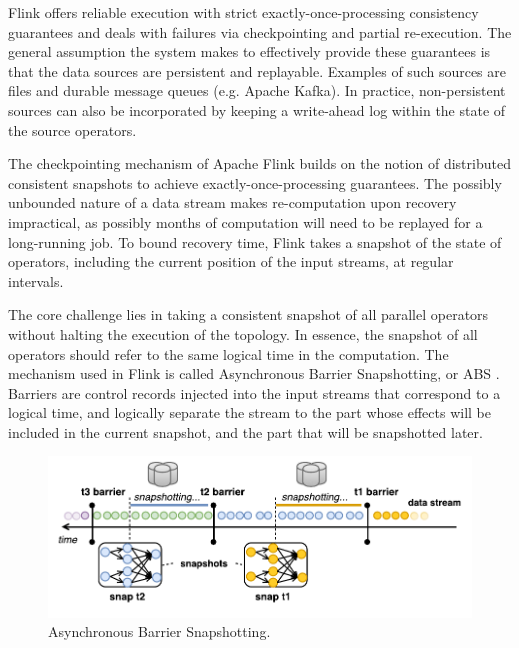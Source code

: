 \documentclass[11pt]{article}
\begin{document}
Flink offers reliable execution with strict exactly-once-processing consistency guarantees and deals with failures via checkpointing and partial re-execution. The general assumption the system makes to effectively provide these guarantees is that the data sources are persistent and replayable. Examples of such sources are files and durable message queues (e.g. Apache Kafka). In practice, non-persistent sources can also be incorporated by keeping a write-ahead log within the state of the source operators.

The checkpointing mechanism of Apache Flink builds on the notion of distributed consistent snapshots to achieve exactly-once-processing guarantees. The possibly unbounded nature of a data stream makes re-computation upon recovery impractical, as possibly months of computation will need to be replayed for a long-running job. To bound recovery time, Flink takes a snapshot of the state of operators, including the current position of the input streams, at regular intervals.

The core challenge lies in taking a consistent snapshot of all parallel operators without halting the execution of the topology. In essence, the snapshot of all operators should refer to the same logical time in the computation. The mechanism used in Flink is called Asynchronous Barrier Snapshotting, or ABS \cite{carbone2015lightweight}. Barriers are control records injected into the input streams that correspond to a logical time, and logically separate the stream to the part whose effects will be included in the current snapshot, and the part that will be snapshotted later.

\begin{figure}[t!]
	\centering
  	\includegraphics[width=.75\textwidth]{figs/snaps.pdf}
  	\vspace{-6mm}
	\caption{Asynchronous Barrier Snapshotting.}
	\vspace{-2mm}
	\label{fig:snapshots}
\end{figure}
\end{document}
